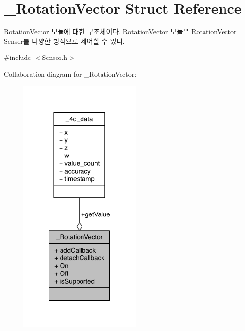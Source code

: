 \hypertarget{struct__RotationVector}{\section{\-\_\-\-Rotation\-Vector Struct Reference}
\label{struct__RotationVector}
}


Rotation\-Vector 모듈에 대한 구조체이다. Rotation\-Vector 모듈은 Rotation\-Vector Sensor를 다양한 방식으로 제어할 수 있다.  




{\ttfamily \#include $<$Sensor.\-h$>$}



Collaboration diagram for \-\_\-\-Rotation\-Vector\-:\nopagebreak
\begin{figure}[H]
\begin{center}
\leavevmode
\includegraphics[width=173pt]{df/d91/struct__RotationVector__coll__graph}
\end{center}
\end{figure}
